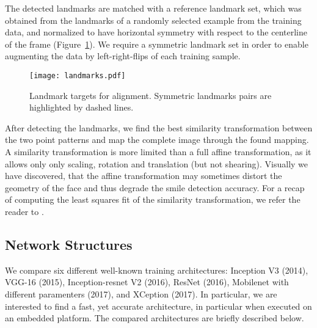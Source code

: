 \documentclass[conference]{IEEEtran}
\begin{document}
The detected landmarks are matched with a reference landmark set, which was obtained from the landmarks of a randomly selected example from the training data, and normalized to have horizontal symmetry with respect to the centerline of the frame (Figure~\ref{fig:landmarks}). We require a symmetric landmark set in order to enable augmenting the data by left-right-flips of each training sample. 


\begin{figure}
\centering
\texttt{[image: landmarks.pdf]}
\caption{Landmark targets for alignment. Symmetric landmarks pairs are highlighted by dashed lines.}\label{fig:landmarks}
\end{figure}


After detecting the landmarks, we find the best similarity transformation between the two point patterns and map the complete image through the found mapping. A similarity transformation is more limited than a full affine transformation, as it allows only only scaling, rotation and translation (but not shearing). Visually we have discovered, that the affine transformation may sometimes distort the geometry of the face and thus degrade the smile detection accuracy. For a recap of computing the least squares fit of the similarity transformation, we refer the reader to \cite{bai2018}.


\subsection{Network Structures}

We compare six different well-known training architectures: Inception V3 (2014), VGG-16 (2015), Inception-resnet V2 (2016), ResNet (2016), Mobilenet with different paramenters (2017), and XCeption (2017). In particular, we are interested to find a fast, yet accurate architecture, in particular when executed on an embedded platform. The compared architectures are briefly described below.
\end{document}
